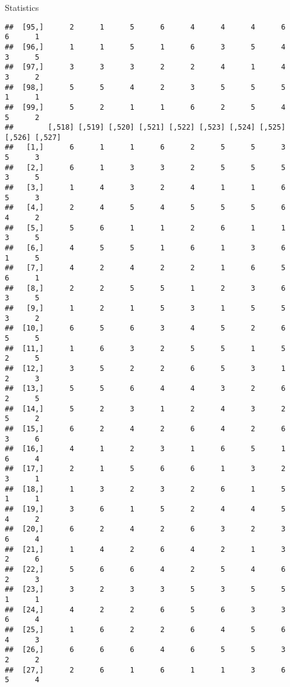 \documentclass[
  ignorenonframetext,
]{beamer}
\begin{document}
\begin{frame}[fragile]{Statistics}
\begin{verbatim}
##  [95,]      2      1      5      6      4      4      4      6      6      1
##  [96,]      1      1      5      1      6      3      5      4      3      5
##  [97,]      3      3      3      2      2      4      1      4      3      2
##  [98,]      5      5      4      2      3      5      5      5      1      1
##  [99,]      5      2      1      1      6      2      5      4      5      2
##        [,518] [,519] [,520] [,521] [,522] [,523] [,524] [,525] [,526] [,527]
##   [1,]      6      1      1      6      2      5      5      3      5      3
##   [2,]      6      1      3      3      2      5      5      5      3      5
##   [3,]      1      4      3      2      4      1      1      6      5      3
##   [4,]      2      4      5      4      5      5      5      6      4      2
##   [5,]      5      6      1      1      2      6      1      1      3      5
##   [6,]      4      5      5      1      6      1      3      6      1      5
##   [7,]      4      2      4      2      2      1      6      5      6      1
##   [8,]      2      2      5      5      1      2      3      6      3      5
##   [9,]      1      2      1      5      3      1      5      5      3      2
##  [10,]      6      5      6      3      4      5      2      6      5      5
##  [11,]      1      6      3      2      5      5      1      5      2      5
##  [12,]      3      5      2      2      6      5      3      1      2      3
##  [13,]      5      5      6      4      4      3      2      6      2      5
##  [14,]      5      2      3      1      2      4      3      2      5      2
##  [15,]      6      2      4      2      6      4      2      6      3      6
##  [16,]      4      1      2      3      1      6      5      1      6      4
##  [17,]      2      1      5      6      6      1      3      2      3      1
##  [18,]      1      3      2      3      2      6      1      5      1      1
##  [19,]      3      6      1      5      2      4      4      5      4      2
##  [20,]      6      2      4      2      6      3      2      3      6      4
##  [21,]      1      4      2      6      4      2      1      3      2      6
##  [22,]      5      6      6      4      2      5      4      6      2      3
##  [23,]      3      2      3      3      5      3      5      5      1      1
##  [24,]      4      2      2      6      5      6      3      3      6      4
##  [25,]      1      6      2      2      6      4      5      6      4      3
##  [26,]      6      6      6      4      6      5      5      3      2      2
##  [27,]      2      6      1      6      1      1      3      6      5      4

\end{verbatim}
\end{frame}
\end{document}
